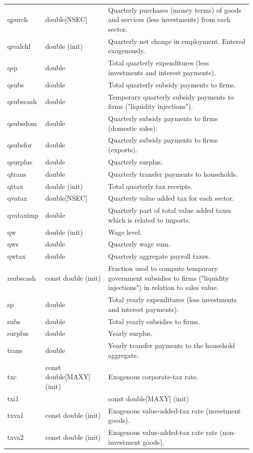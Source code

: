 \documentclass{article}
\begin{document}
\begin{longtable}{p{}p{}p{}}
qpurch & double[NSEC] & Quarterly purchases (money terms) of goods and services (less investments) from each sector.\\
qrealchl & double (init) & Quarterly net change in employment. Entered exogenously.\\
qsp & double & Total quarterly expenditures (less investments and interest payments).\\
qsubs & double & Total quarterly subsidy payments to firms.\\
qsubscash & double & Temporary quarterly subsidy payments to firms ("liquidity injections").\\
qsubsdom & double & Quarterly subsidy payments to firms (domestic sales).\\
qsubsfor & double & Quarterly subsidy payments to firms (exports).\\
qsurplus & double & Quarterly surplus.\\
qtrans & double & Quarterly transfer payments to households.\\
qttax & double (init) & Total quarterly tax receipts.\\
qvatax & double[NSEC] & Quarterly value added tax for each sector.\\
qvataximp& double  & Quarterly part of total value added taxes which is related to imports. \\
qw & double (init) & Wage level.\\
qws & double & Quarterly wage sum.\\
qwtax & double & Quarterly aggregate payroll taxes.\\
rsubscash & const double (init) & Fraction used to compute temporary government subsidies to firms ("liquidity injections") in relation to sales value. \\
sp & double & Total yearly expenditures (less investments and interest payments).\\
subs & double & Total yearly subsidies to firms.\\
surplus & double & Yearly surplus.\\
trans & double & Yearly transfer payments to the household aggregate.\\
txc & const double[MAXY] (init) & Exogenous corporate-tax rate.\\
txi1 & & const double[MAXY] (init)\\
txva1 & const double (init) & Exogenous value-added-tax rate (investment goods).\\
txva2 & const double (init) & Exogenous value-added-tax rate rate (non-investment goods).\\

\end{longtable}
\end{document}
